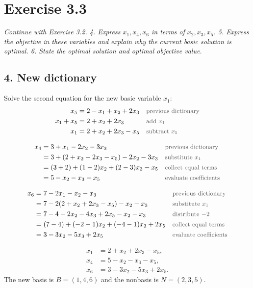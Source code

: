 \documentclass[a4paper,11pt]{article}
\newif\ifexplain
\newcommand{\aufgabe}[1]{\section*{Exercise #1}}
\newcommand{\angabe}[1]{\textit{#1}\par\smallskip}
\newcommand{\teil}[1]{\subsection*{#1}}
\newcommand{\why}[1]{\text{\small\color{black!65}#1}}
\newcommand{\explain}[1]{\ifexplain\begin{erklbox}#1\end{erklbox}\fi}
\begin{document}
\aufgabe{3.3}
\angabe{Continue with Exercise 3.2. 4. Express $x_1,x_4,x_6$ in terms of $x_2,x_3,x_5$.
5. Express the objective in these variables and explain why the current basic solution is optimal.
6. State the optimal solution and optimal objective value.}

\teil{4. New dictionary}
Solve the second equation for the new basic variable $x_1$:
\begin{align*}
x_5&=2-x_1+x_2+2x_3&&\why{previous dictionary}\\
x_1+x_5&=2+x_2+2x_3&&\why{add $x_1$}\\
x_1&=2+x_2+2x_3-x_5&&\why{subtract $x_5$}
\end{align*}
\explain{Wir tauschen $x_1$ und $x_5$. Das heißt Pivot: $x_1$ wird Basisvariable, $x_5$ Nichtbasisvariable. Die neue Gleichung setzen wir in die anderen Basiszeilen und in die Zielfunktion ein. Dabei dürfen keine alten Basisvariablen rechts übrig bleiben.}
\begin{align*}
x_4&=3+x_1-2x_2-3x_3&&\why{previous dictionary}\\
&=3+(2+x_2+2x_3-x_5)-2x_2-3x_3&&\why{substitute $x_1$}\\
&=(3+2)+(1-2)x_2+(2-3)x_3-x_5&&\why{collect equal terms}\\
&=5-x_2-x_3-x_5&&\why{evaluate coefficients}
\end{align*}
\explain{In der ersten Zeile wird $x_1$ mit Faktor $+1$ ersetzt. Die neuen Koeffizienten von $x_2$ und $x_3$ sind deshalb jeweils $-1$. Die Konstante steigt von $3$ auf $5$.}
\begin{align*}
x_6&=7-2x_1-x_2-x_3&&\why{previous dictionary}\\
&=7-2(2+x_2+2x_3-x_5)-x_2-x_3&&\why{substitute $x_1$}\\
&=7-4-2x_2-4x_3+2x_5-x_2-x_3&&\why{distribute $-2$}\\
&=(7-4)+(-2-1)x_2+(-4-1)x_3+2x_5&&\why{collect equal terms}\\
&=3-3x_2-5x_3+2x_5&&\why{evaluate coefficients}
\end{align*}
\explain{Hier steht vor der Klammer $-2$. Dieser Faktor trifft jeden Term. Besonders beim letzten Term ist das Vorzeichen wichtig: Aus $-2(-x_5)$ wird $+2x_5$.}
\[\boxed{\begin{aligned}
x_1&=2+x_2+2x_3-x_5,\\
x_4&=5-x_2-x_3-x_5,\\
x_6&=3-3x_2-5x_3+2x_5.
\end{aligned}}\]
The new basis is $B=(1,4,6)$ and the nonbasis is $N=(2,3,5)$.
\end{document}
